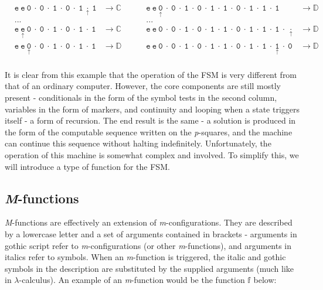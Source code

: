 \documentclass[Master.tex]{subfiles}
\begin{document}
\begin{equation*}
\begin{aligned}
&\mathtt{e\ e\ 0\ \cdot\ 0\ \cdot\ 1\ \cdot\ 0\ \cdot\ 1\ \underset{\uparrow}{\cdot}\ 1} & \rightarrow \mathbb{C}\ \ \ \ \ \ \ \ \ \ & \mathtt{e\ e\ \underset{\uparrow}{0}\ \cdot\ 0\ \cdot\ 1\ \cdot\ 0\ \cdot\ 1\ \cdot\ 1\ \cdot\ 0\ \cdot\ 1\ \cdot\ 1\ \cdot\ 1} & \rightarrow \mathbb{D}\\
&...& &...&\\
&\mathtt{e\ \underset{\uparrow}{e}\ 0\ \cdot\ 0\ \cdot\ 1\ \cdot\ 0\ \cdot\ 1\ \cdot\ 1} & \rightarrow \mathbb{C}\ \ \ \ \ \ \ \ \ \ & \mathtt{e\ e\ 0\ \cdot\ 0\ \cdot\ 1\ \cdot\ 0\ \cdot\ 1\ \cdot\ 1\ \cdot\ 0\ \cdot\ 1\ \cdot\ 1\ \cdot\ 1\ \cdot\ \underset{\uparrow}{\cdot}} & \rightarrow \mathbb{D}\\
&\mathtt{e\ e\ \underset{\uparrow}{0}\ \cdot\ 0\ \cdot\ 1\ \cdot\ 0\ \cdot\ 1\ \cdot\ 1} & \rightarrow \mathbb{D}\ \ \ \ \ \ \ \ \ \ & \mathtt{e\ e\ 0\ \cdot\ 0\ \cdot\ 1\ \cdot\ 0\ \cdot\ 1\ \cdot\ 1\ \cdot\ 0\ \cdot\ 1\ \cdot\ 1\ \cdot\ \underset{\uparrow}{1}\ \cdot\ 0} & \rightarrow \mathbb{D}\\
\end{aligned}
\end{equation*}

\clearpage

It is clear from this example that the operation of the FSM is very different from that of an ordinary computer. However, the core components are still mostly present - conditionals in the form of the symbol tests in the second column, variables in the form of markers, and continuity and looping when a state triggers itself - a form of recursion. The end result is the same - a solution is produced in the form of the computable sequence written on the \textit{p}-squares, and the machine can continue this sequence without halting indefinitely. Unfortunately, the operation of this machine is somewhat complex and involved. To simplify this, we will introduce a type of function for the FSM.

\subsection{\textit{M}-functions}\label{sec:mfunctions}

\textit{M}-functions are effectively an extension of \textit{m}-configurations. They are described by a lowercase letter and a set of arguments contained in brackets - arguments in gothic script refer to \textit{m}-configurations (or other \textit{m}-functions), and arguments in italics refer to symbols. When an \textit{m}-function is triggered, the italic and gothic symbols in the description are substituted by the supplied arguments (much like in $\lambda$-calculus). An example of an \textit{m}-function would be the function $\mathbb{f}$ below:
\end{document}
